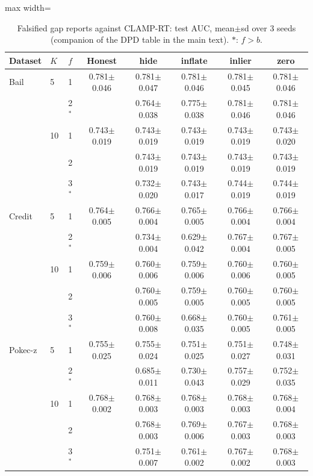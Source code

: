 \begin{table}[tbp]
\centering
\scriptsize
\setlength{\tabcolsep}{3pt}
\caption{Falsified gap reports against CLAMP-RT: test AUC, mean$\pm$sd over 3 seeds (companion of the DPD table in the main text). $\ast$: $f>b$.}
\label{tab:s_e4auc}
\begin{adjustbox}{max width=\textwidth}
\begin{tabular}{llcccccc}
\toprule
Dataset & $K$ & $f$ & Honest & hide & inflate & inlier & zero \\
\midrule
Bail & 5 & 1 & 0.781$\pm$0.046 & 0.781$\pm$0.047 & 0.781$\pm$0.046 & 0.781$\pm$0.045 & 0.781$\pm$0.046 \\
 &  & 2$^\ast$ &  & 0.764$\pm$0.038 & 0.775$\pm$0.038 & 0.781$\pm$0.046 & 0.781$\pm$0.046 \\
 & 10 & 1 & 0.743$\pm$0.019 & 0.743$\pm$0.019 & 0.743$\pm$0.019 & 0.743$\pm$0.019 & 0.743$\pm$0.020 \\
 &  & 2 &  & 0.743$\pm$0.019 & 0.743$\pm$0.019 & 0.743$\pm$0.019 & 0.743$\pm$0.019 \\
 &  & 3$^\ast$ &  & 0.732$\pm$0.020 & 0.743$\pm$0.017 & 0.744$\pm$0.019 & 0.744$\pm$0.019 \\
\midrule
Credit & 5 & 1 & 0.764$\pm$0.005 & 0.766$\pm$0.004 & 0.765$\pm$0.005 & 0.766$\pm$0.004 & 0.766$\pm$0.004 \\
 &  & 2$^\ast$ &  & 0.734$\pm$0.004 & 0.629$\pm$0.042 & 0.767$\pm$0.004 & 0.767$\pm$0.005 \\
 & 10 & 1 & 0.759$\pm$0.006 & 0.760$\pm$0.006 & 0.759$\pm$0.006 & 0.760$\pm$0.006 & 0.760$\pm$0.005 \\
 &  & 2 &  & 0.760$\pm$0.005 & 0.759$\pm$0.005 & 0.760$\pm$0.005 & 0.760$\pm$0.005 \\
 &  & 3$^\ast$ &  & 0.760$\pm$0.008 & 0.668$\pm$0.035 & 0.760$\pm$0.005 & 0.761$\pm$0.005 \\
\midrule
Pokec-z & 5 & 1 & 0.755$\pm$0.025 & 0.755$\pm$0.024 & 0.751$\pm$0.025 & 0.751$\pm$0.027 & 0.748$\pm$0.031 \\
 &  & 2$^\ast$ &  & 0.685$\pm$0.011 & 0.730$\pm$0.043 & 0.757$\pm$0.029 & 0.752$\pm$0.035 \\
 & 10 & 1 & 0.768$\pm$0.002 & 0.768$\pm$0.003 & 0.768$\pm$0.003 & 0.768$\pm$0.003 & 0.768$\pm$0.004 \\
 &  & 2 &  & 0.768$\pm$0.003 & 0.769$\pm$0.006 & 0.767$\pm$0.003 & 0.768$\pm$0.003 \\
 &  & 3$^\ast$ &  & 0.751$\pm$0.007 & 0.761$\pm$0.002 & 0.767$\pm$0.002 & 0.768$\pm$0.003 \\

\end{tabular}
\end{adjustbox}
\end{table}

